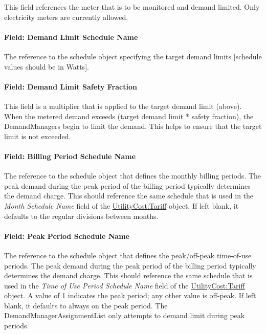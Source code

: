 This field references the meter that is to be monitored and demand limited. Only electricity meters are currently allowed.

\paragraph{Field: Demand Limit Schedule Name}\label{field-demand-limit-schedule-name}

The reference to the schedule object specifying the target demand limits {[}schedule values should be in Watts{]}.

\paragraph{Field: Demand Limit Safety Fraction}\label{field-demand-limit-safety-fraction}

This field is a multiplier that is applied to the target demand limit (above). When the metered demand exceeds (target demand limit * safety fraction), the DemandManagers begin to limit the demand. This helps to ensure that the target limit is not exceeded.

\paragraph{Field: Billing Period Schedule Name}\label{field-billing-period-schedule-name}

The reference to the schedule object that defines the monthly billing periods. The peak demand during the peak period of the billing period typically determines the demand charge. This should reference the same schedule that is used in the \emph{Month Schedule Name} field of the \hyperref[utilitycosttariff]{UtilityCost:Tariff} object. If left blank, it defaults to the regular divisions between months.

\paragraph{Field: Peak Period Schedule Name}\label{field-peak-period-schedule-name}

The reference to the schedule object that defines the peak/off-peak time-of-use periods. The peak demand during the peak period of the billing period typically determines the demand charge. This should reference the same schedule that is used in the \emph{Time of Use Period Schedule Name} field of the \hyperref[utilitycosttariff]{UtilityCost:Tariff} object. A value of 1 indicates the peak period; any other value is off-peak. If left blank, it defaults to always on the peak period. The DemandManagerAssignmentList only attempts to demand limit during peak periods.


